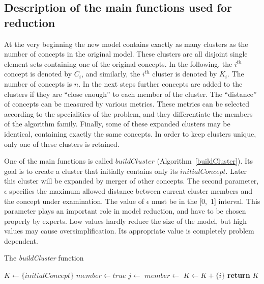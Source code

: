 \documentclass[graybox]{svmult}
\begin{document}
\subsection{Description of the main functions used for reduction}
\label{sec:reductionFunctions}

At the very beginning the new model contains exactly as many clusters as the number of concepts in the original model. These clusters are all disjoint single element sets containing one of the original concepts. In the following, the $i^{th}$ concept is denoted by $C_i$, and similarly, the $i^{th}$ cluster is denoted by $K_i$. The number of concepts is $n$. In the next steps further concepts are added to the clusters if they are ``close enough'' to each member of the cluster. The ``distance'' of concepts can be measured by various metrics. These metrics can be selected according to the specialities of the problem, and they differentiate the members of the algorithm family. Finally, some of these expanded clusters may be identical, containing exactly the same concepts. In order to keep clusters unique, only one of these clusters is retained.

One of the main functions is called $buildCluster$ (Algorithm~\ref{buildCluster}). Its goal is to create a cluster that initially contains only its $initialConcept$. Later this cluster will be expanded by merger of other concepts. The second parameter, $\epsilon$ specifies the maximum allowed distance between current cluster members and the concept under examination. The value of $\epsilon$ must be in the [0,~1] interval. This parameter plays an important role in model reduction, and have to be chosen properly by experts. Low values hardly reduce the size of the model, but high values may cause oversimplification. Its appropriate value is completely problem dependent.

\begin{algorithm}
  \caption{The \emph{buildCluster} function}\label{buildCluster}
  \begin{algorithmic}[1]
    \State $K\gets \{initialConcept\}$
        \State $member \gets true$
          \State $j \gets$ 
          \State $member \gets$ 
        \EndWhile
          \State $K \gets K + \{i\}$
        \EndIf
      \EndIf
    \EndFor
    \State \textbf{return} $K$
    \EndFunction
  \end{algorithmic}
\end{algorithm}
\end{document}
